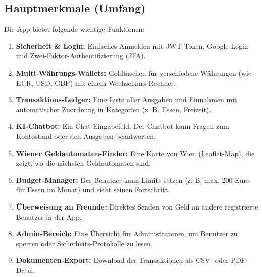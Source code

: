 \documentclass[11pt,a4paper]{article}
\begin{document}
\subsection{Hauptmerkmale (Umfang)}
Die App bietet folgende wichtige Funktionen:
\begin{enumerate}
    \item \textbf{Sicherheit \& Login:} Einfaches Anmelden mit JWT-Token, Google-Login und Zwei-Faktor-Authentifizierung (2FA).
    \item \textbf{Multi-Währungs-Wallets:} Geldtaschen für verschiedene Währungen (wie EUR, USD, GBP) mit einem Wechselkurs-Rechner.
    \item \textbf{Transaktions-Ledger:} Eine Liste aller Ausgaben und Einnahmen mit automatischer Zuordnung in Kategorien (z. B. Essen, Freizeit).
    \item \textbf{KI-Chatbot:} Ein Chat-Eingabefeld. Der Chatbot kann Fragen zum Kontostand oder den Ausgaben beantworten.
    \item \textbf{Wiener Geldautomaten-Finder:} Eine Karte von Wien (Leaflet-Map), die zeigt, wo die nächsten Geldautomaten sind.
    \item \textbf{Budget-Manager:} Der Benutzer kann Limits setzen (z. B. max. 200 Euro für Essen im Monat) und sieht seinen Fortschritt.
    \item \textbf{Überweisung an Freunde:} Direktes Senden von Geld an andere registrierte Benutzer in der App.
    \item \textbf{Admin-Bereich:} Eine Übersicht für Administratoren, um Benutzer zu sperren oder Sicherheits-Protokolle zu lesen.
    \item \textbf{Dokumenten-Export:} Download der Transaktionen als CSV- oder PDF-Datei.
\end{enumerate}
\end{document}
